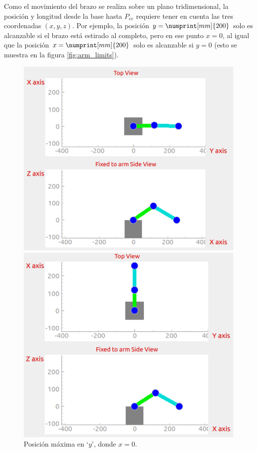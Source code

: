 Como el movimiento del brazo se realiza sobre un plano tridimensional, la posición y
longitud desde la base hasta $P_{ee}$ requiere tener en cuenta las tres coordenadas
$\left(x, y, z\right)$. Por ejemplo, la posición $y = \numprint[mm]{200}$ solo es 
alcanzable si el brazo está estirado al completo, pero en ese punto $x = 0$, al igual
que la posición $x = \numprint[mm]{200}$ solo es alcanzable si $y = 0$ (esto se muestra
en la figura \ref{fig:arm_limits}).

\begin{figure}[H]
    \begin{minipage}{.45\linewidth}
        \centering
        \includegraphics[width=\linewidth]{pictures/arm_y_max.png}
        \caption{Posición máxima en `$y$', donde $x = 0$.}
    \end{minipage}
    \hfill
    \begin{minipage}{.45\linewidth}
        \centering
        \includegraphics[width=\linewidth]{pictures/arm_x_max.png}

\end{minipage}
\end{figure}
